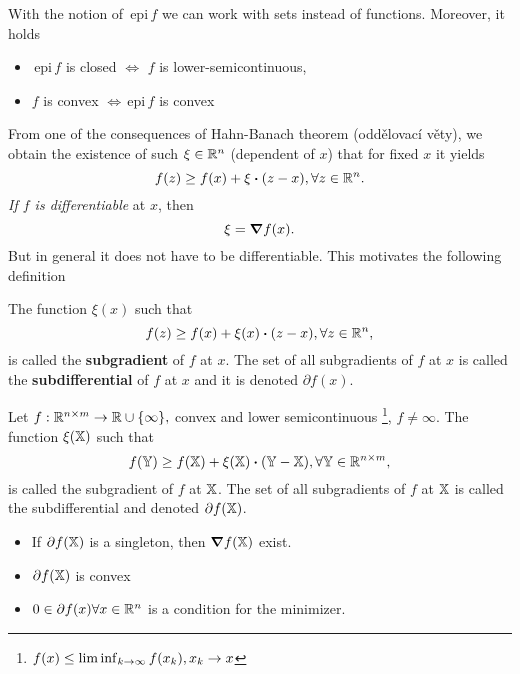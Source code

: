 \documentclass[11pt]{scrartcl} %
\begin{document}
\begin{remark}
    With the notion of $\, \text{epi} \,f$ we can work with sets instead of functions. Moreover, it holds
    \begin{itemize}
	    \item $\, \text{epi} \,f$ is closed $\Leftrightarrow$ $f$ is lower-semicontinuous,
	    \item $f$ is convex $\Leftrightarrow\, \text{epi} \,f$ is convex
    \end{itemize}
\end{remark}
From one of the consequences of Hahn-Banach theorem (oddělovací věty), we obtain the existence of such $\xi \in {\mathbb R}^n$ (dependent of $x$) that for fixed $x$ it yields
\[
	f(z) \geq f(x) + \xi \vdot (z-x), \forall z \in \R^n.
\]
\textit{If $f$ is differentiable} at $x$, then
\[
	\xi = \grad f(x).
\]
But in general it does not have to be differentiable. This motivates the following definition

\begin{definition}
	The function $\xi(x)$ such that
	\[
		f(z) \geq f(x) + \xi(x) \vdot (z-x), \forall z \in \R^n,
	\]
	is called the \textbf{subgradient} of $f$ at $x$.
	The set of all subgradients of $f$ at $x$ is called the \textbf{subdifferential} of $f$ at $x$ and it is denoted $\partial f (x).$

	Let $f: {\mathbb R}^{n \times m} \to {\mathbb R} \cup \{\infty\}, $ convex and lower semicontinuous \footnote{$f\qty(x) \leq \liminf_{k\to \infty}f(x_k), x_k \to x$}, $f \neq \infty$. The function $\xi\qty(\mathbb{X})$ such that
	\[
		f\qty(\tensorq{Y}) \geq f\qty(\tensorq{X})+ \xi\qty(\tensorq{X}) \vdot \qty(\tensorq{Y}- \tensorq{X}), \forall \tensorq{Y} \in \R^{n \times m},
	\]
	 is called the subgradient of $f$ at $\mathbb{X}$. The set of all subgradients of $f$ at $\mathbb{X}$ is called the subdifferential and denoted $\partial f\qty(\mathbb{X})$. 

\end{definition}


\begin{remark}
	\begin{itemize}
		\item If $\partial f\qty(\mathbb{X})$ is a singleton, then $\grad f\qty(\mathbb{X})$ exist.
		\item $\partial f\qty(\mathbb{X})$ is convex
		\item  $0 \in \partial f(x) \forall x \in {\mathbb R}^n$ is a condition for the minimizer.
	\end{itemize}
\end{remark}
\end{document}
